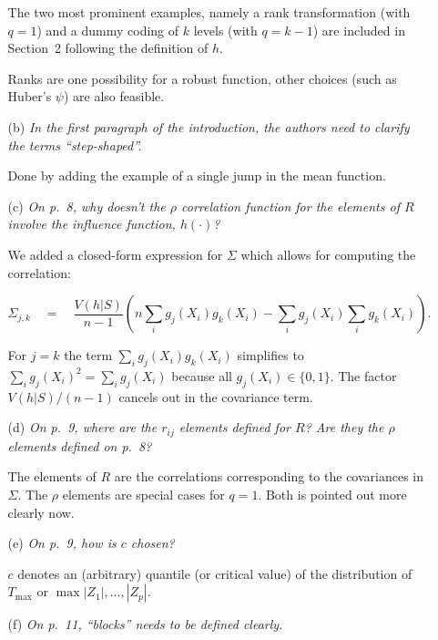 \documentclass[11pt,a4paper]{article}
\begin{document}
\begin{enumerate}
\begin{itemize}
	       The two most prominent examples, namely a rank transformation
               (with $q = 1$) and a dummy coding of $k$ levels (with $q = k - 1$)
               are included in Section~2 following the definition of $h$. 
	       
	       Ranks are one possibility for a robust function, other choices
	       (such as Huber's $\psi$) are also feasible.
	       	       
    \item[(b)] \textit{In the first paragraph of the introduction, the authors need to
               clarify the terms ``step-shaped''.}
	       
	       Done by adding the example of a single jump in the mean function.
	       
    \item[(c)] \textit{On p.~8, why doesn't the $\rho$ correlation function for the
               elements of $R$ involve the influence function, $h(\cdot)$?}
	       
	       We added a closed-form expression for $\Sigma$ which allows
               for computing the correlation:

                 \[ \Sigma_{j,k} \quad = \quad \frac{V(h | S)}{n-1}
	            \left(n \sum_i g_j(X_i) g_k(X_i) - \sum_i g_j(X_i) \sum_i g_k(X_i)\right). \]
               
	       For $j = k$ the term $\sum_i g_j(X_i) g_k(X_i)$ simplifies to 
               $\sum_i g_j(X_i)^2 = \sum_i g_j(X_i)$ because all $g_j(X_i) \in \{0, 1\}$.
	       The factor $V(h | S) / (n-1)$ cancels out in the covariance term.
	       
    \item[(d)] \textit{On p.~9, where are the $r_{ij}$ elements defined for $R$? Are
               they the $\rho$ elements defined on p.~8?}
    
               The elements of $R$ are the correlations corresponding to the covariances
	       in $\Sigma$. The $\rho$ elements are special cases for $q = 1$.
	       Both is pointed out more clearly now.

    \item[(e)] \textit{On p.~9, how is $c$ chosen?}
    
               $c$ denotes an (arbitrary) quantile (or critical value) of the distribution
	       of $T_{\max}$ or $\max  |Z_1|, \dots, |Z_p|$.
	       
    \item[(f)] \textit{On p.~11, ``blocks'' needs to be defined clearly.}
               

\end{itemize}
\end{enumerate}
\end{document}
